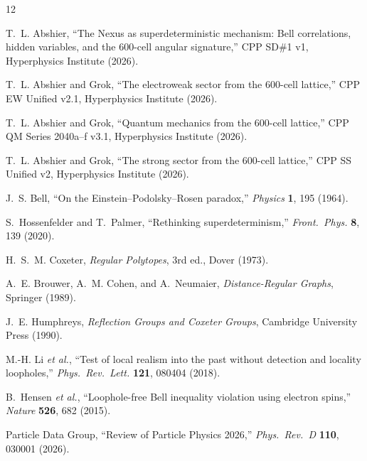 \documentclass[11pt,a4paper]{article}
\begin{document}

\begin{thebibliography}{12}

T.~L. Abshier,
``The Nexus as superdeterministic mechanism: Bell correlations,
hidden variables, and the 600-cell angular signature,''
CPP SD\#1 v1, Hyperphysics Institute (2026).

T.~L. Abshier and Grok,
``The electroweak sector from the 600-cell lattice,''
CPP EW Unified v2.1, Hyperphysics Institute (2026).

T.~L. Abshier and Grok,
``Quantum mechanics from the 600-cell lattice,''
CPP QM Series 2040a--f v3.1, Hyperphysics Institute (2026).

T.~L. Abshier and Grok,
``The strong sector from the 600-cell lattice,''
CPP SS Unified v2, Hyperphysics Institute (2026).

J.~S. Bell,
``On the Einstein--Podolsky--Rosen paradox,''
\textit{Physics} \textbf{1}, 195 (1964).

S.~Hossenfelder and T.~Palmer,
``Rethinking superdeterminism,''
\textit{Front.\ Phys.} \textbf{8}, 139 (2020).

H.~S.~M. Coxeter,
\textit{Regular Polytopes}, 3rd ed., Dover (1973).

A.~E. Brouwer, A.~M. Cohen, and A.~Neumaier,
\textit{Distance-Regular Graphs}, Springer (1989).

J.~E. Humphreys,
\textit{Reflection Groups and Coxeter Groups},
Cambridge University Press (1990).

M.-H. Li \textit{et al.},
``Test of local realism into the past without detection and
locality loopholes,''
\textit{Phys.\ Rev.\ Lett.} \textbf{121}, 080404 (2018).

B.~Hensen \textit{et al.},
``Loophole-free Bell inequality violation using electron spins,''
\textit{Nature} \textbf{526}, 682 (2015).

Particle Data Group,
``Review of Particle Physics 2026,''
\textit{Phys.\ Rev.\ D} \textbf{110}, 030001 (2026).

\end{thebibliography}
\end{document}
